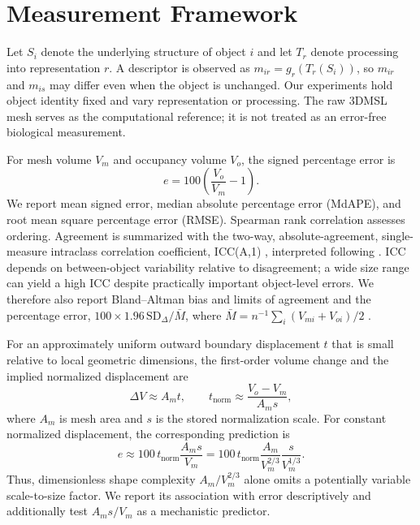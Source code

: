 \documentclass[journal]{IEEEtran}
\begin{document}
\section{Measurement Framework}

Let $S_i$ denote the underlying structure of object $i$ and let $T_r$ denote processing into representation $r$. A descriptor is observed as $m_{ir}=g_r(T_r(S_i))$, so $m_{ir}$ and $m_{is}$ may differ even when the object is unchanged. Our experiments hold object identity fixed and vary representation or processing. The raw 3DMSL mesh serves as the computational reference; it is not treated as an error-free biological measurement.

For mesh volume $V_m$ and occupancy volume $V_o$, the signed percentage error is
\begin{equation}
e=100\left(\frac{V_o}{V_m}-1\right).
\end{equation}
We report mean signed error, median absolute percentage error (MdAPE), and root mean square percentage error (RMSE). Spearman rank correlation assesses ordering. Agreement is summarized with the two-way, absolute-agreement, single-measure intraclass correlation coefficient, ICC(A,1) \cite{ref25}, interpreted following \cite{ref18}. ICC depends on between-object variability relative to disagreement; a wide size range can yield a high ICC despite practically important object-level errors. We therefore also report Bland--Altman bias and limits of agreement \cite{ref17} and the percentage error, $100\times1.96\,\mathrm{SD}_{\Delta}/\bar{M}$, where $\bar{M}=n^{-1}\sum_i(V_{mi}+V_{oi})/2$ \cite{ref26}.

For an approximately uniform outward boundary displacement $t$ that is small relative to local geometric dimensions, the first-order volume change and the implied normalized displacement are
\begin{equation}
\Delta V\approx A_m t,\qquad t_{\mathrm{norm}}\approx\frac{V_o-V_m}{A_m s},
\end{equation}
where $A_m$ is mesh area and $s$ is the stored normalization scale. For constant normalized displacement, the corresponding prediction is
\begin{equation}
e\approx100\,t_{\mathrm{norm}}\frac{A_m s}{V_m}
=100\,t_{\mathrm{norm}}\frac{A_m}{V_m^{2/3}}\frac{s}{V_m^{1/3}}.
\end{equation}
Thus, dimensionless shape complexity $A_m/V_m^{2/3}$ alone omits a potentially variable scale-to-size factor. We report its association with error descriptively and additionally test $A_ms/V_m$ as a mechanistic predictor.
\end{document}
